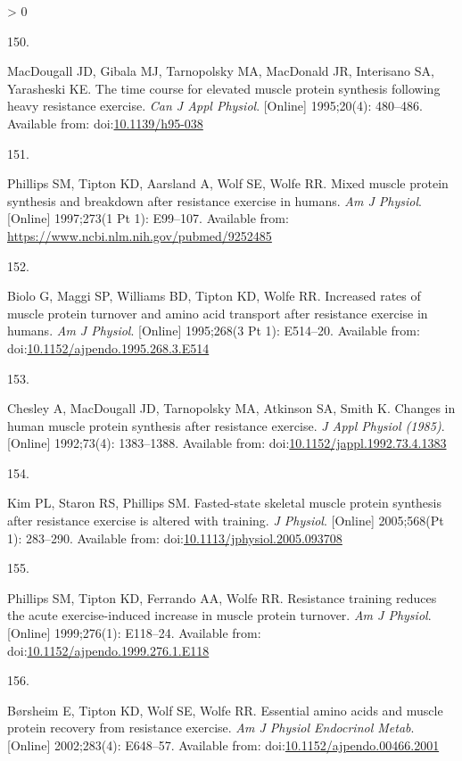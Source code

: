 \documentclass[twoside,10pt]{gihclass} %
\newlength{\cslhangindent}
\newlength{\csllabelwidth}
\newenvironment{CSLReferences}[3] %
 {%
  \setlength{\parindent}{0pt}
  \ifodd #1 \everypar{\setlength{\hangindent}{\cslhangindent}}\ignorespaces\fi
  \ifnum #2 > 0
  \setlength{\parskip}{#2\baselineskip}
  \fi
 }%
 {}
\newcommand{\CSLLeftMargin}[1]{\parbox[t]{\maxof{\widthof{#1}}{\csllabelwidth}}{#1}}
\newcommand{\CSLRightInline}[1]{\parbox[t]{\linewidth}{#1}}
\begin{document}
\begin{CSLReferences}{0}{0}
\leavevmode\hypertarget{ref-RN2711}{}%
\CSLLeftMargin{150. }
\CSLRightInline{MacDougall JD, Gibala MJ, Tarnopolsky MA, MacDonald JR, Interisano SA, Yarasheski KE. The time course for elevated muscle protein synthesis following heavy resistance exercise. \emph{Can J Appl Physiol}. {[}Online{]} 1995;20(4): 480--486. Available from: doi:\href{https://doi.org/10.1139/h95-038}{10.1139/h95-038}}

\leavevmode\hypertarget{ref-RN786}{}%
\CSLLeftMargin{151. }
\CSLRightInline{Phillips SM, Tipton KD, Aarsland A, Wolf SE, Wolfe RR. Mixed muscle protein synthesis and breakdown after resistance exercise in humans. \emph{Am J Physiol}. {[}Online{]} 1997;273(1 Pt 1): E99--107. Available from: \url{https://www.ncbi.nlm.nih.gov/pubmed/9252485}}

\leavevmode\hypertarget{ref-RN2712}{}%
\CSLLeftMargin{152. }
\CSLRightInline{Biolo G, Maggi SP, Williams BD, Tipton KD, Wolfe RR. Increased rates of muscle protein turnover and amino acid transport after resistance exercise in humans. \emph{Am J Physiol}. {[}Online{]} 1995;268(3 Pt 1): E514--20. Available from: doi:\href{https://doi.org/10.1152/ajpendo.1995.268.3.E514}{10.1152/ajpendo.1995.268.3.E514}}

\leavevmode\hypertarget{ref-RN2717}{}%
\CSLLeftMargin{153. }
\CSLRightInline{Chesley A, MacDougall JD, Tarnopolsky MA, Atkinson SA, Smith K. Changes in human muscle protein synthesis after resistance exercise. \emph{J Appl Physiol (1985)}. {[}Online{]} 1992;73(4): 1383--1388. Available from: doi:\href{https://doi.org/10.1152/jappl.1992.73.4.1383}{10.1152/jappl.1992.73.4.1383}}

\leavevmode\hypertarget{ref-RN1521}{}%
\CSLLeftMargin{154. }
\CSLRightInline{Kim PL, Staron RS, Phillips SM. Fasted-state skeletal muscle protein synthesis after resistance exercise is altered with training. \emph{J Physiol}. {[}Online{]} 2005;568(Pt 1): 283--290. Available from: doi:\href{https://doi.org/10.1113/jphysiol.2005.093708}{10.1113/jphysiol.2005.093708}}

\leavevmode\hypertarget{ref-RN2713}{}%
\CSLLeftMargin{155. }
\CSLRightInline{Phillips SM, Tipton KD, Ferrando AA, Wolfe RR. Resistance training reduces the acute exercise-induced increase in muscle protein turnover. \emph{Am J Physiol}. {[}Online{]} 1999;276(1): E118--24. Available from: doi:\href{https://doi.org/10.1152/ajpendo.1999.276.1.E118}{10.1152/ajpendo.1999.276.1.E118}}

\leavevmode\hypertarget{ref-RN2714}{}%
\CSLLeftMargin{156. }
\CSLRightInline{Børsheim E, Tipton KD, Wolf SE, Wolfe RR. Essential amino acids and muscle protein recovery from resistance exercise. \emph{Am J Physiol Endocrinol Metab}. {[}Online{]} 2002;283(4): E648--57. Available from: doi:\href{https://doi.org/10.1152/ajpendo.00466.2001}{10.1152/ajpendo.00466.2001}}


\end{CSLReferences}
\end{document}
